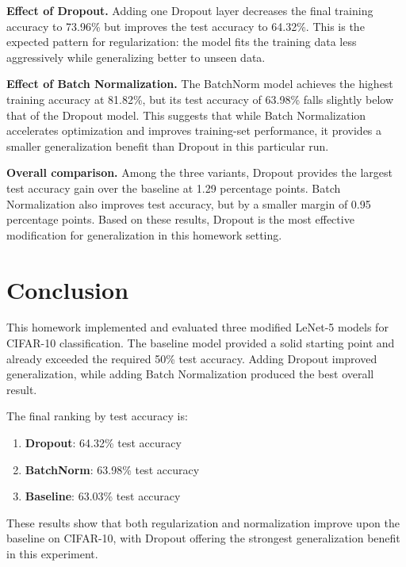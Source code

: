 \documentclass[11pt]{article}
\begin{document}
\textbf{Effect of Dropout.} Adding one Dropout layer decreases the final training
accuracy to 73.96\% but improves the test accuracy to 64.32\%. This is the expected
pattern for regularization: the model fits the training data less aggressively while
generalizing better to unseen data.

\textbf{Effect of Batch Normalization.} The BatchNorm model achieves the highest
training accuracy at 81.82\%, but its test accuracy of 63.98\% falls slightly below
that of the Dropout model. This suggests that while Batch Normalization accelerates
optimization and improves training-set performance, it provides a smaller
generalization benefit than Dropout in this particular run.

\textbf{Overall comparison.} Among the three variants, Dropout provides the largest
test accuracy gain over the baseline at 1.29 percentage points. Batch Normalization
also improves test accuracy, but by a smaller margin of 0.95 percentage points. Based
on these results, Dropout is the most effective modification for generalization in
this homework setting.

\section{Conclusion}
This homework implemented and evaluated three modified LeNet-5 models for CIFAR-10
classification. The baseline model provided a solid starting point and already exceeded
the required 50\% test accuracy. Adding Dropout improved generalization, while adding
Batch Normalization produced the best overall result.

The final ranking by test accuracy is:
\begin{enumerate}
  \item \textbf{Dropout}: 64.32\% test accuracy
  \item \textbf{BatchNorm}: 63.98\% test accuracy
  \item \textbf{Baseline}: 63.03\% test accuracy
\end{enumerate}

These results show that both regularization and normalization improve upon the baseline
on CIFAR-10, with Dropout offering the strongest generalization benefit in this
experiment.
\end{document}
